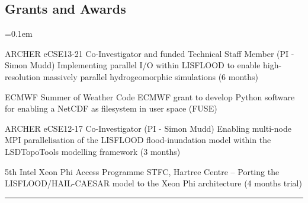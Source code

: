 \documentclass[10.5pt,a4]{article}
\makeatletter
\newcommand{\headerrow}[2]
{\begin{tabular*}{\linewidth}{l@{\extracolsep{\fill}}r}
	#1 &
	#2 \\
\end{tabular*}}
\makeatother
\begin{document}
\subsection*{Grants and Awards}
	\parskip=0.1em
\begin{itemize*}
	\item 
	  {ARCHER eCSE13-21 Co-Investigator and funded Technical Staff Member (PI - Simon Mudd)}
	  {Implementing parallel I/O within LISFLOOD to enable high-resolution massively parallel hydrogeomorphic simulations (6  months)}
	  
	\item 
	  {ECMWF Summer of Weather Code}
	  {ECMWF grant to develop Python software for enabling a NetCDF as filesystem in user space (FUSE)}

	\item 
	  {ARCHER eCSE12-17 Co-Investigator (PI - Simon Mudd)}
	  {Enabling multi-node MPI parallelisation of the LISFLOOD flood-inundation model within the LSDTopoTools modelling framework (3  months) }

	\item 
	  {5th Intel Xeon Phi Access Programme}
	  {STFC, Hartree Centre -- Porting the LISFLOOD/HAIL-CAESAR model to the Xeon Phi architecture (4 months trial)}


\end{itemize*}

\hrule
\vspace{-0.4em}
\end{document}

